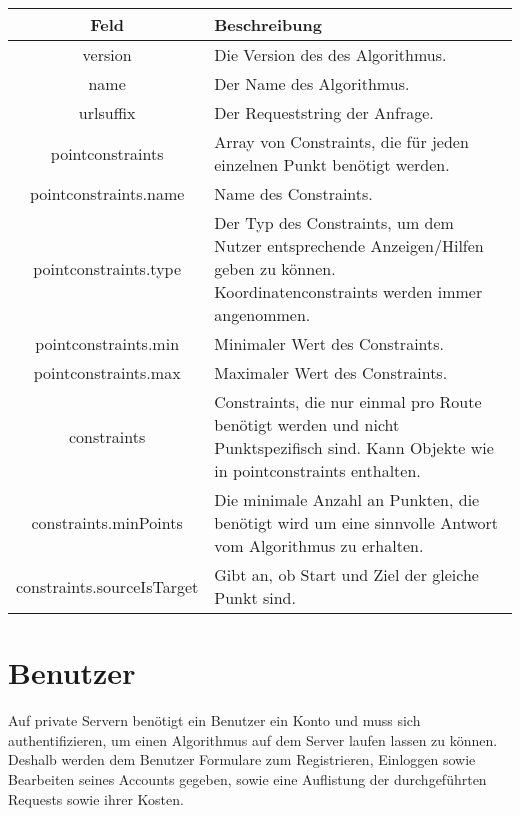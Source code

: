 \documentclass[ngerman,titlepage,parskip=true]{scrartcl}
\begin{document}
    \noindent \begin{tabular}{|c|p{11.5cm}|}
    	\hline
    	\textbf{Feld} & \textbf{Beschreibung} \\ 
    	\hline \hline
    	
    	version & Die Version des des Algorithmus. \\ 
    	\hline
    	
    	name & Der Name des Algorithmus. \\
    	\hline
    	
    	urlsuffix & Der Requeststring der Anfrage. \\
    	\hline
    	
    	pointconstraints & Array von Constraints, die für jeden einzelnen Punkt benötigt werden. \\
    	\hline
    	
    	pointconstraints.name & Name des Constraints. \\
    	\hline
    	
    	pointconstraints.type & Der Typ des Constraints, um dem Nutzer entsprechende Anzeigen/Hilfen geben zu können. Koordinatenconstraints werden immer angenommen.\\ 
    	\hline
    	
    	pointconstraints.min & Minimaler Wert des Constraints. \\
    	\hline
    	
    	pointconstraints.max & Maximaler Wert des Constraints. \\
    	\hline
    	
    	constraints & Constraints, die nur einmal pro Route benötigt werden und nicht Punktspezifisch sind. Kann Objekte wie in pointconstraints enthalten. \\
    	\hline
    	
    	constraints.minPoints & Die minimale Anzahl an Punkten, die benötigt wird um eine sinnvolle Antwort vom Algorithmus zu erhalten.\\ 
		\hline
		
		constraints.sourceIsTarget & Gibt an, ob Start und Ziel der gleiche Punkt sind.\\    		\hline    		
   	\end{tabular}
   	\clearpage
\section{Benutzer}

Auf private Servern benötigt ein Benutzer ein Konto und muss sich authentifizieren, um einen Algorithmus auf dem Server laufen lassen zu können.
Deshalb werden dem Benutzer Formulare zum Registrieren, Einloggen sowie Bearbeiten seines Accounts gegeben, sowie eine Auflistung der durchgeführten Requests sowie ihrer Kosten.
\end{document}

